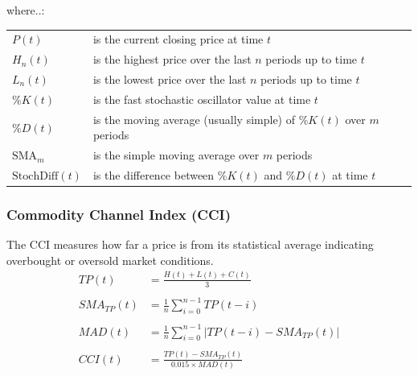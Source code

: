\documentclass[a4paper,12pt]{report}
\begin{document}
\begin{minipage}{\textwidth}

where..:\\

\begin{tabularx}{\textwidth}{@{}l@{\hspace{2em}--\hspace{2em}}X@{}}
  $P(t)$         & is the current closing price at time $t$ \\
  $H_n(t)$       & is the highest price over the last $n$ periods up to time $t$ \\
  $L_n(t)$       & is the lowest price over the last $n$ periods up to time $t$ \\
  $\%K(t)$       & is the fast stochastic oscillator value at time $t$ \\
  $\%D(t)$       & is the moving average (usually simple) of $\%K(t)$ over $m$ periods \\
  $\text{SMA}_m$ & is the simple moving average over $m$ periods \\
  $\text{StochDiff}(t)$ & is the difference between $\%K(t)$ and $\%D(t)$ at time $t$ \\
\end{tabularx}

\end{minipage}

			\subsubsection{Commodity Channel Index (CCI)}

The CCI measures how far a price is from its statistical average indicating overbought or oversold market conditions. \cite{26}\\

\[
\begin{aligned}
  TP(t) &= \frac{H(t) + L(t) + C(t)}{3} \\\\
  SMA_{TP}(t) &= \frac{1}{n} \sum_{i=0}^{n-1} TP(t-i) \\\\
  MAD(t) &= \frac{1}{n} \sum_{i=0}^{n-1} |TP(t-i) - SMA_{TP}(t)| \\\\
  CCI(t) &= \frac{TP(t) - SMA_{TP}(t)}{0.015 \times MAD(t)} \\\\
\end{aligned}
\]
\end{document}
